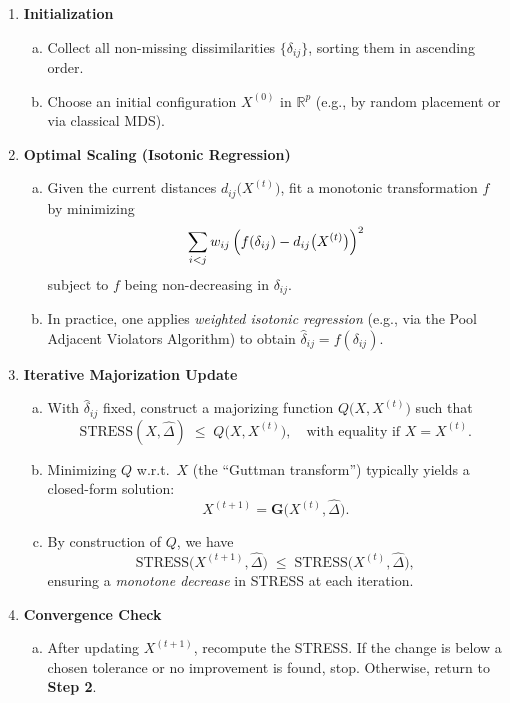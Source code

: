   \begin{enumerate}
    \item \textbf{Initialization}
      \begin{enumerate}[(a)]
          \item Collect all non-missing dissimilarities $\{\delta_{ij}\}$, sorting them in ascending order.
          \item Choose an initial configuration $X^{(0)}$ in $\mathbb{R}^p$ (e.g., by random placement or via classical MDS).
      \end{enumerate}

    \item \textbf{Optimal Scaling (Isotonic Regression)}
      \begin{enumerate}[(a)]
          \item Given the current distances $d_{ij}\bigl(X^{(t)}\bigr)$, fit a monotonic transformation $f$ by minimizing
          \[
            \sum_{i<j} w_{ij}\,\Bigl(f(\delta_{ij}) - d_{ij}\bigl(X^{(t)}\bigr)\Bigr)^2
          \]
          subject to $f$ being non-decreasing in $\delta_{ij}$.
          \item In practice, one applies \emph{weighted isotonic regression} (e.g., via the Pool Adjacent Violators Algorithm) to obtain $\hat{\delta}_{ij} = f(\delta_{ij})$.
      \end{enumerate}

    \item \textbf{Iterative Majorization Update}
      \begin{enumerate}[(a)]
          \item With $\hat{\delta}_{ij}$ fixed, construct a majorizing function $Q\bigl(X, X^{(t)}\bigr)$ such that
          \[
            \mathrm{STRESS}(X,\hat{\Delta}) \;\le\; Q\bigl(X, X^{(t)}\bigr),
            \quad
            \text{with equality if } X = X^{(t)}.
          \]
          \item Minimizing $Q$ w.r.t.\ $X$ (the “Guttman transform”) typically yields a closed-form solution:
          \[
            X^{(t+1)} = \mathbf{G}\bigl(X^{(t)}, \hat{\Delta}\bigr).
          \]
          \item By construction of $Q$, we have
          \[
            \mathrm{STRESS}\bigl(X^{(t+1)}, \hat{\Delta}\bigr) 
            \;\le\;
            \mathrm{STRESS}\bigl(X^{(t)}, \hat{\Delta}\bigr),
          \]
          ensuring a \emph{monotone decrease} in STRESS at each iteration.
      \end{enumerate}

    \item \textbf{Convergence Check}
      \begin{enumerate}[(a)]
          \item After updating $X^{(t+1)}$, recompute the STRESS. If the change is below a chosen tolerance or no improvement is found, stop. Otherwise, return to \textbf{Step 2}.
      \end{enumerate}
\end{enumerate}


